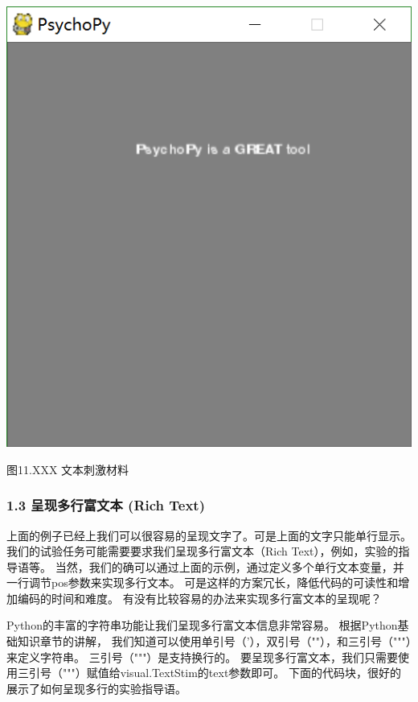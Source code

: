 \documentclass[11pt]{article}
\makeatletter
\def\maxwidth{\ifdim\Gin@nat@width>\linewidth\linewidth
    \else\Gin@nat@width\fi}
\let\Oldincludegraphics\includegraphics
\renewcommand{\includegraphics}[1]{\Oldincludegraphics[width=.8\maxwidth]{#1}}
\makeatother
\begin{document}
    \includegraphics{ch11-VisualTextStim示例图片.PNG}

图11.XXX 文本刺激材料

    \subsubsection{1.3 呈现多行富文本 (Rich
Text)}\label{ux5448ux73b0ux591aux884cux5bccux6587ux672c-rich-text}

上面的例子已经上我们可以很容易的呈现文字了。可是上面的文字只能单行显示。
我们的试验任务可能需要要求我们呈现多行富文本（Rich
Text），例如，实验的指导语等。
当然，我们的确可以通过上面的示例，通过定义多个单行文本变量，并一行调节pos参数来实现多行文本。
可是这样的方案冗长，降低代码的可读性和增加编码的时间和难度。
有没有比较容易的办法来实现多行富文本的呈现呢？

Python的丰富的字符串功能让我们呈现多行富文本信息非常容易。
根据Python基础知识章节的讲解，
我们知道可以使用单引号（'），双引号（""），和三引号（"""）来定义字符串。
三引号（"""）是支持换行的。
要呈现多行富文本，我们只需要使用三引号（"""）赋值给visual.TextStim的text参数即可。
下面的代码块，很好的展示了如何呈现多行的实验指导语。
\end{document}

